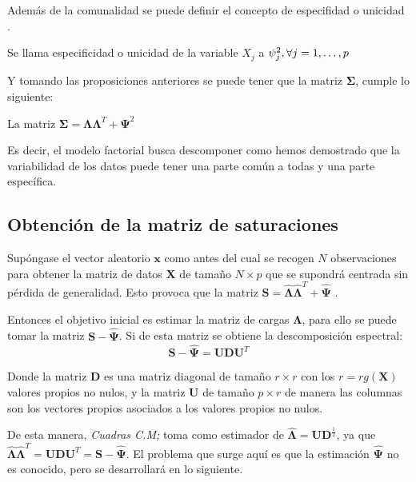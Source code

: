 \noindent Además de la comunalidad se puede definir el concepto de especifidad o unicidad \cite{Cuadras 2014}.
\begin{defi}

Se llama especificidad o unicidad de la variable $X_j$ a $\psi_j^2,\\ \forall j=1,\ldots, p$ 

\end{defi}

\noindent Y tomando las proposiciones anteriores se puede tener que la matriz $\mathbf{\Sigma}$, cumple lo siguiente:
\begin{teorema}\label{Descomposición Varianza}
La matriz $\mathbf{\Sigma}=\mathbf{\Lambda}\mathbf{\Lambda}^T+\mathbf{\Psi}^2$
\end{teorema}

\noindent Es decir, el modelo factorial busca descomponer como hemos demostrado que la variabilidad de los datos puede tener una parte común a todas y una parte específica. 

\subsection{Obtención de la matriz de saturaciones}
\noindent Supóngase el vector aleatorio $\mathbf{x}$ como antes del cual se recogen $N$ observaciones para obtener la matriz de datos $\mathbf{X}$ de tamaño $N\times p$ que se supondrá centrada sin pérdida de generalidad. Esto provoca que la matriz $\mathbf{S}=\mathbf{\hat{\Lambda}}\mathbf{\hat{\Lambda}}^T+\mathbf{\hat{\Psi}}$ \cite{Peña 2002}. 

\noindent Entonces el objetivo inicial es estimar la matriz de cargas $\mathbf{\Lambda}$, para ello se puede tomar la matriz $\mathbf{S}-\mathbf{\hat{\Psi}}$. Si de esta matriz se obtiene la descomposición espectral:
\begin{equation}
\mathbf{S}-\mathbf{\hat{\Psi}}=\mathbf{U}\mathbf{D}\mathbf{U}^T
\end{equation}

\noindent Donde la matriz $\mathbf{D}$ es una matriz diagonal de tamaño $r\times r$ con los $r=rg(\mathbf{X})$ valores propios no nulos, y la matriz $\mathbf{U}$ de tamaño $p\times r$ de manera las columnas son los vectores propios asociados a los valores propios no nulos. 

\noindent De esta manera, \emph{Cuadras C.M;} \cite{Cuadras 2014} toma como estimador de $\mathbf{\hat{\Lambda}}=\mathbf{UD}^{\frac{1}{2}}$, ya que $\mathbf{\hat{\Lambda}}\mathbf{\hat{\Lambda}}^T=\mathbf{U}\mathbf{D}\mathbf{U}^T= \mathbf{S-\hat{\Psi}}$. El problema que surge aquí es que la estimación $\mathbf{\hat{\Psi}}$ no es conocido, pero se desarrollará en lo siguiente. 

